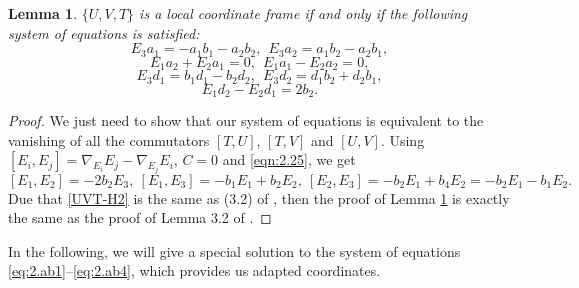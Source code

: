 \documentclass[reqno]{amsart}%
\newtheorem{lemma}[theorem]{Lemma}
\theoremstyle{definition}
\numberwithin{equation}{section}
\begin{document}
\begin{lemma}\label{lemma:2.1a1}
$\{U,V,T\}$ is a local coordinate frame if and only if
the following system of equations is satisfied:
%
\begin{equation}\label{eq:2.ab1}
E_3a_1=-a_1b_1-a_2b_2,\ \ E_3a_2=a_1b_2-a_2b_1,
\end{equation}
%
\begin{equation}\label{eq:2.ab2}
E_1a_2+E_2a_1=0,\ \ E_1a_1-E_2a_2=0,
\end{equation}
%
\begin{equation}\label{eq:2.ab3}
E_3d_1=b_1d_1-b_2d_2,\ \ E_3d_2=d_1b_2+d_2b_1,
\end{equation}
%
\begin{equation}\label{eq:2.ab4}
E_1d_2-E_2d_1=2b_2.
\end{equation}

\end{lemma}
%
\begin{proof}
We just need to show that our system of equations is equivalent to the vanishing of all the commutators $[T,U]$, $[T,V]$ and $[U,V]$.
Using $[E_i,E_j]=\nabla_{E_i} {E_j}-\nabla_{E_j} {E_i}$, $C=0$
and \eqref{eqn:2.25}, we get
$$
[E_1,E_2]=-2b_2E_3,\ [E_1,E_3]=-b_1E_1+b_2E_2,\ [E_2,E_3]=-b_2E_1+b_4E_2=-b_2E_1-b_1E_2.
$$
Due that \eqref{UVT-H2} is the same as (3.2) of \cite{LVWY}, then the proof of Lemma \ref{lemma:2.1a1} is exactly the same as the proof of Lemma 3.2 of \cite{LVWY}. 
\end{proof}

In the following, we will give a special solution to the system of equations \eqref{eq:2.ab1}--\eqref{eq:2.ab4}, which provides us adapted coordinates. 

\end{document}
